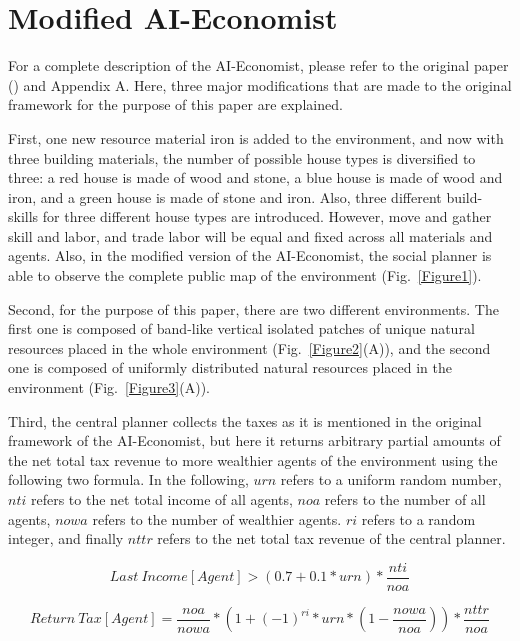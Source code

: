 \documentclass{article}
\begin{document}
\section{Modified AI-Economist}
For a complete description of the AI-Economist, please refer to the original paper (\citep{Zheng2022}) and Appendix A. Here, three major modifications that are made to the original framework for the purpose of this paper are explained. 

First, one new resource material \textendash iron \textendash is added to the environment, and now with three building materials, the number of possible house types is diversified to three: a red house is made of wood and stone, a blue house is made of wood and iron, and a green house is made of stone and iron. Also, three different build-skills for three different house types are introduced. However, move and gather skill and labor, and trade labor will be equal and fixed across all materials and agents. Also, in the modified version of the AI-Economist, the social planner is able to observe the complete public map of the environment (Fig.~\ref{Figure1}).

Second, for the purpose of this paper, there are two different environments. The first one is composed of band-like vertical isolated patches of unique natural resources placed in the whole environment (Fig.~\ref{Figure2}(A)), and the second one is composed of uniformly distributed natural resources placed in the environment (Fig.~\ref{Figure3}(A)).

Third, the central planner collects the taxes as it is mentioned in the original framework of the AI-Economist, but here it returns arbitrary partial amounts of the net total tax revenue to more wealthier agents of the environment using the following two formula. In the following, \( urn \) refers to a uniform random number, \( nti \) refers to the net total income of all agents, \( noa \) refers to the number of all agents, \( nowa \) refers to the number of wealthier agents. \( ri \) refers to a random integer, and finally \( nttr \) refers to the net total tax revenue of the central planner.

\begin{equation}\label{Equation1}
	Last\:Income[Agent] > (0.7 + 0.1 * urn) * \frac{nti}{noa}
\end{equation}

\begin{equation}\label{Equation2}
    Return\:Tax[Agent] = \frac{noa}{nowa} * (1 + (-1)^{ri} * urn * (1 - \frac{nowa}{noa})) * \frac{nttr}{noa}
\end{equation}
\end{document}
